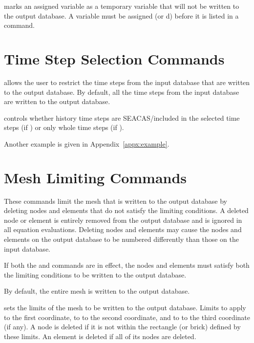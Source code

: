 \newpage %
 {
 marks an assigned variable as a temporary variable that
will not be written to the output database. A variable must be assigned
(or d) before it is listed in a  command.
}

\newpage
\section{Time Step Selection Commands} \label{cmd:timesel}

\caps{\PROGRAM} allows the user to restrict the time steps from the
input database that are written to the output database. By default, all
the time steps from the input database are written to the output
database.







 {
 controls whether history time steps are SEACAS/included in the
selected time steps (if ) or only whole time steps (if
).
}



Another example is given in Appendix~\ref{appx:example}.

\newpage
\section{Mesh Limiting Commands} \label{cmd:meshlimit}

These commands limit the mesh that is written to the output database by
deleting nodes and elements that do not satisfy the limiting conditions.
A deleted node or element is entirely removed from the output database
and is ignored in all equation evaluations. Deleting nodes and elements
may cause the nodes and elements on the output database to be numbered
differently than those on the input database.

If both the  and  commands are in effect, the
nodes and elements must satisfy both the limiting conditions to be
written to the output database.

By default, the entire mesh is written to the output database.

 {
 sets the limits of the mesh to be written to the output
database. Limits  to  apply to the first
coordinate,  to  to the second coordinate, and
 to  to the third coordinate (if any). A node is
deleted if it is not within the rectangle (or brick) defined by these
limits. An element is deleted if all of its nodes are deleted.
}

